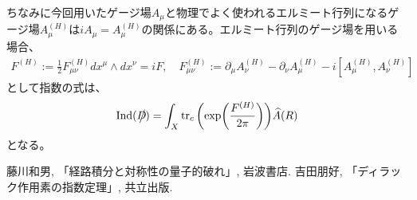 \documentclass[12pt,a4paper]{jlreq}
\DeclareMathOperator*{\Ind}{\mathrm{Ind}}
\newcommand{\del}{\partial}
\newcommand{\Dsla}{D\hspace{-0.65em}\big/}
\begin{document}
ちなみに今回用いたゲージ場$A_{\mu}$と物理でよく使われるエルミート行列になるゲージ場$A^{(H)}_{\mu}$は$iA_{\mu}=A^{(H)}_{\mu}$の関係にある。エルミート行列のゲージ場を用いる場合、
\begin{align*}
  F^{(H)}:=\frac12 F^{(H)}_{\mu\nu}dx^{\mu}\wedge dx^{\nu}=iF,\quad
  F^{(H)}_{\mu\nu}:=\del_{\mu}A^{(H)}_{\nu}-\del_{\nu}A^{(H)}_{\mu}-i[A^{(H)}_{\mu},A^{(H)}_{\nu}]
\end{align*}
として指数の式は、
\begin{align}
\Ind(\Dsla)
 =\int_{X} \tr_{c}\qty(\exp(\frac{F^{(H)}}{2\pi}))\widehat{A}(R)
\end{align}
となる。
\begin{thebibliography}{9}
   藤川和男, 「経路積分と対称性の量子的破れ」, 岩波書店.
   吉田朋好, 「ディラック作用素の指数定理」, 共立出版.
\end{thebibliography}
\end{document}
